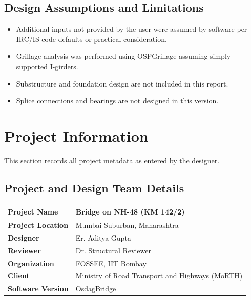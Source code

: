 \documentclass[12pt,a4paper]{report}
\numberwithin{table}{chapter}
\numberwithin{figure}{chapter}
\begin{document}
\section*{Design Assumptions and Limitations}
\label{sec:assumptions}

\begin{itemize}
\item Additional inputs not provided by the user were assumed by software per IRC/IS code defaults or practical consideration.
\item Grillage analysis was performed using OSPGrillage assuming simply supported I-girders.
\item Substructure and foundation design are not included in this report.
\item Splice connections and bearings are not designed in this version.
\end{itemize}

\titleformat{\chapter}[block]{\normalfont\Large\bfseries\centering}{\thechapter}{1em}{}
\titlespacing*{\chapter}{0pt}{-30pt}{10pt}


\chapter{Project Information}

This section records all project metadata as entered by the designer.

\section{Project and Design Team Details}
\label{sec:project-details}

\begin{tabular}{|L{5.5cm}|L{8.5cm}|}
\hline
\textbf{Project Name} & Bridge on NH-48 (KM 142/2) \\
\hline
\textbf{Project Location} & Mumbai Suburban, Maharashtra \\
\hline
\textbf{Designer} & Er. Aditya Gupta \\
\hline
\textbf{Reviewer} & Dr. Structural Reviewer \\
\hline
\textbf{Organization} & FOSSEE, IIT Bombay \\
\hline
\textbf{Client} & Ministry of Road Transport and Highways (MoRTH) \\
\hline
\textbf{Software Version} & OsdagBridge \\
\hline
\end{tabular}
\end{document}
